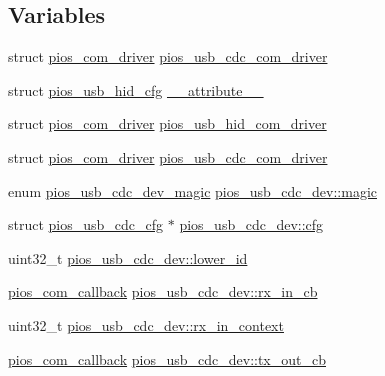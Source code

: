 \subsection*{\-Variables}
\begin{DoxyCompactItemize}
\item 
struct \hyperlink{structpios__com__driver}{pios\-\_\-com\-\_\-driver} \hyperlink{group___p_i_o_s___u_s_b___c_o_m_gad661bf144c28ea36f290b0092e6957e2}{pios\-\_\-usb\-\_\-cdc\-\_\-com\-\_\-driver}
\item 
struct \hyperlink{structpios__usb__hid__cfg}{pios\-\_\-usb\-\_\-hid\-\_\-cfg} \hyperlink{group___p_i_o_s___u_s_b___c_o_m_gac56d93a50756ec83103cdfc4e5a31f3e}{\-\_\-\-\_\-attribute\-\_\-\-\_\-}
\item 
struct \hyperlink{structpios__com__driver}{pios\-\_\-com\-\_\-driver} \hyperlink{group___p_i_o_s___u_s_b___c_o_m_ga7bc5f832e095cad60f463436e377bb5d}{pios\-\_\-usb\-\_\-hid\-\_\-com\-\_\-driver}
\item 
struct \hyperlink{structpios__com__driver}{pios\-\_\-com\-\_\-driver} \hyperlink{group___p_i_o_s___u_s_b___c_o_m_gad661bf144c28ea36f290b0092e6957e2}{pios\-\_\-usb\-\_\-cdc\-\_\-com\-\_\-driver}
\item 
enum \hyperlink{group___p_i_o_s___u_s_b___c_o_m_gab4c476b0e464c59dcf6eadec015a87b8}{pios\-\_\-usb\-\_\-cdc\-\_\-dev\-\_\-magic} \hyperlink{group___p_i_o_s___u_s_b___c_o_m_gaf1f80b904c24c3a9d91aa7c8d9f0e0f7}{pios\-\_\-usb\-\_\-cdc\-\_\-dev\-::magic}
\item 
struct \hyperlink{structpios__usb__cdc__cfg}{pios\-\_\-usb\-\_\-cdc\-\_\-cfg} $\ast$ \hyperlink{group___p_i_o_s___u_s_b___c_o_m_gac129f3ba21ca6cb9ff92da45033acbbb}{pios\-\_\-usb\-\_\-cdc\-\_\-dev\-::cfg}
\item 
uint32\-\_\-t \hyperlink{group___p_i_o_s___u_s_b___c_o_m_ga5431d5544be717a197964da5a3b08d2a}{pios\-\_\-usb\-\_\-cdc\-\_\-dev\-::lower\-\_\-id}
\item 
\hyperlink{group___p_i_o_s___c_o_m_ga23f1888821f1f74a50c02adc459df597}{pios\-\_\-com\-\_\-callback} \hyperlink{group___p_i_o_s___u_s_b___c_o_m_gaf3cf777f785d8b2a117c736064e859de}{pios\-\_\-usb\-\_\-cdc\-\_\-dev\-::rx\-\_\-in\-\_\-cb}
\item 
uint32\-\_\-t \hyperlink{group___p_i_o_s___u_s_b___c_o_m_gae98fcbb800c5655c05106c1e73a1de01}{pios\-\_\-usb\-\_\-cdc\-\_\-dev\-::rx\-\_\-in\-\_\-context}
\item 
\hyperlink{group___p_i_o_s___c_o_m_ga23f1888821f1f74a50c02adc459df597}{pios\-\_\-com\-\_\-callback} \hyperlink{group___p_i_o_s___u_s_b___c_o_m_ga1e9a79d782c5671d5e35aafe776632f3}{pios\-\_\-usb\-\_\-cdc\-\_\-dev\-::tx\-\_\-out\-\_\-cb}

\end{DoxyCompactItemize}

